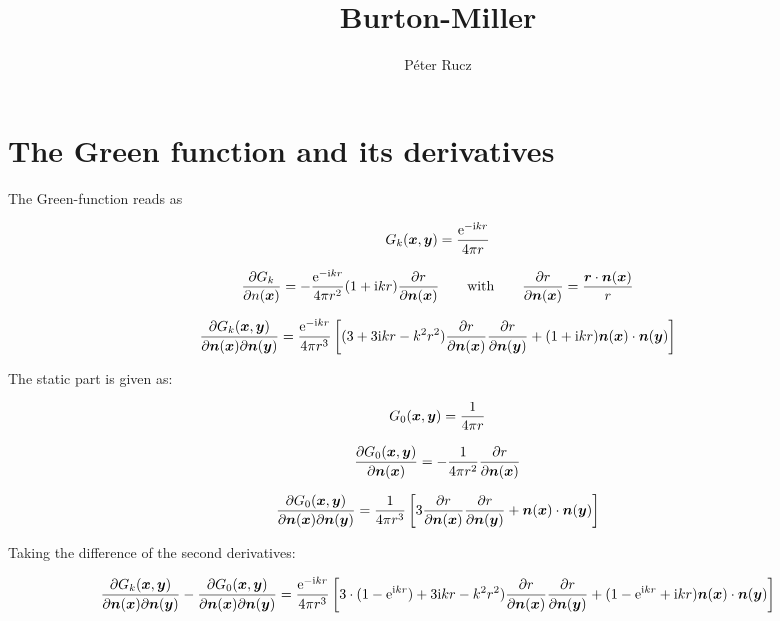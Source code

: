 \documentclass[a4paper, 10pt]{article}
\author{Péter Rucz}
\title{Burton-Miller}
\newcommand{\te}{\mathrm{e}}
\newcommand{\ti}{\mathrm{i}}
\newcommand{\tn}{\bm{\mathnormal{n}}}
\newcommand{\tr}{\bm{\mathnormal{r}}}
\newcommand{\tx}{\bm{\mathnormal{x}}}
\newcommand{\ty}{\bm{\mathnormal{y}}}
\begin{document}
\maketitle

\section{The Green function and its derivatives}

The Green-function reads as

\begin{equation}
	G_k(\tx, \ty) = \frac{\te^{-\ti k r}}{4 \pi r}
\end{equation}

\begin{equation}
	\frac{\partial G_k}{\partial n(\tx)} = -\frac{\te^{-\ti k r}}{4 \pi r^2}(1 + \ti kr)\frac{\partial r}{\partial \tn(\tx)} \qquad \text{with} \qquad \frac{\partial r}{\partial \tn(\tx)} = \frac{\tr \cdot \tn(\tx)}{r}
\end{equation}


\begin{equation}
	\frac{\partial G_k(\tx, \ty)}{\partial \tn(\tx) \partial \tn(\ty)} = \frac{\te^{- \ti kr}}{4 \pi r^3}\left[(3 + 3 \ti kr - k^2 r^2) \frac{\partial r}{\partial \tn(\tx)}\frac{\partial r}{\partial \tn(\ty)} + (1 + \ti kr) \tn(\tx) \cdot \tn (\ty) \right]
\end{equation}

The static part is given as:

\begin{equation}
	G_0(\tx, \ty) = \frac{1}{4\pi r}
\end{equation}

\begin{equation}
	\frac{\partial G_0(\tx, \ty)}{\partial \tn(\tx)} = -\frac{1}{4\pi r^2} \frac{\partial r}{\partial \tn(\tx)}
\end{equation}

\begin{equation}
	\frac{\partial G_0(\tx, \ty)}{\partial \tn(\tx) \partial \tn(\ty)} = \frac{1}{4 \pi r^3} \left[3 \frac{\partial r}{\partial \tn(\tx)}\frac{\partial r}{\partial \tn(\ty)} + \tn(\tx) \cdot \tn (\ty) \right]
\end{equation}

Taking the difference of the second derivatives:

\begin{align}
	\frac{\partial G_k(\tx, \ty)}{\partial \tn(\tx) \partial \tn(\ty)} - \frac{\partial G_0(\tx, \ty)}{\partial \tn(\tx) \partial \tn(\ty)} = 
	\frac{\te^{- \ti kr}}{4 \pi r^3}\left[3 \cdot (1 - \te^{\ti kr}) + 3 \ti kr - k^2 r^2) \frac{\partial r}{\partial \tn(\tx)}\frac{\partial r}{\partial \tn(\ty)} + (1 - \te^{\ti kr} + \ti kr) \tn(\tx) \cdot \tn (\ty) \right]
\end{align}
\end{document}
